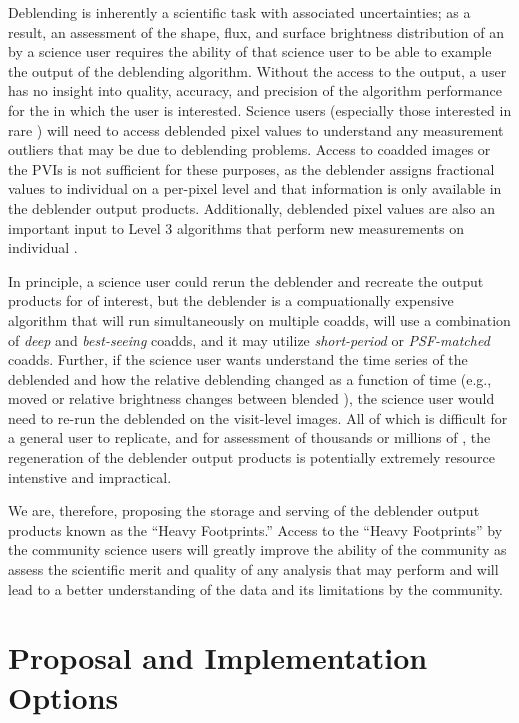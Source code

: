 \documentclass[DM,lsstdraft,toc]{lsstdoc}
\begin{document}
Deblending is inherently a scientific task with associated uncertainties; as a result, an assessment of the shape, flux, and surface brightness distribution of an \Object by a science user requires the ability of that science user to be able to example the output of the deblending algorithm.  Without the access to the output, a user has no insight into quality, accuracy, and precision of the algorithm performance for the \Objects in which the user is interested.  Science users (especially those interested in rare \Objects) will need to access deblended pixel values to understand any measurement outliers that may be due to deblending problems.  Access to coadded images or the PVIs is not sufficient for these purposes, as the deblender assigns fractional values to individual \Objects on a per-pixel level and that information is only available in the deblender output products.  Additionally, deblended pixel values are also an important input to Level 3 algorithms that perform new measurements on individual \Objects.

In principle, a science user could rerun the deblender and recreate the output products for \Objects of interest, but the deblender is a compuationally expensive algorithm that will run simultaneously on multiple coadds, will use a combination of \emph{deep} and \emph{best-seeing} coadds, and it may utilize \emph{short-period} or \emph{PSF-matched} coadds.  Further, if the science user wants understand the time series of the deblended \Objects and how the relative deblending changed as a function of time (e.g., \Objects moved or relative brightness changes between blended \Objects), the science user would need to re-run the deblended on the visit-level images. All of which is difficult for a general user to replicate, and for assessment of thousands or millions of \Objects, the regeneration of the deblender output products is potentially extremely resource intenstive and impractical.

We are, therefore, proposing the storage and serving of the deblender output products known as the ``Heavy Footprints.''  Access to the ``Heavy Footprints'' by the community science users will greatly improve the ability of the community as assess the scientific merit and quality of any analysis that may perform and will lead to a better understanding of the data and its limitations by the community.

\section{Proposal and Implementation Options}
\end{document}
